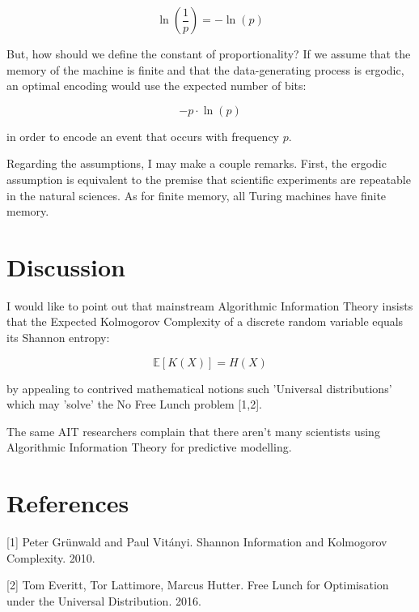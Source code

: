 \documentclass{article}
\begin{document}
\begin{equation}
\ln(\frac{1}{p}) = - \ln(p)
\end{equation}

But, how should we define the constant of proportionality? If we assume that the memory of the machine is finite and that
the data-generating process is ergodic, an optimal encoding would use the expected number of bits:

\begin{equation}
-p \cdot \ln(p)
\end{equation}

in order to encode an event that occurs with frequency $p$.

Regarding the assumptions, I may make a couple remarks. First, the ergodic assumption is equivalent to the premise that
scientific experiments are repeatable in the natural sciences. As for finite memory, all Turing machines have finite
memory.

\newpage 

\section{Discussion}

I would like to point out that mainstream Algorithmic Information Theory insists that the Expected Kolmogorov Complexity
of a discrete random variable equals its Shannon entropy:

\begin{equation}
\mathbb{E}[K(X)] = H(X)
\end{equation}

by appealing to contrived mathematical notions such 'Universal distributions' which may 'solve' the No Free Lunch problem [1,2].

The same AIT researchers complain that there aren't many scientists using Algorithmic Information Theory for predictive
modelling.

\section*{References}

\small
[1] Peter Grünwald and Paul Vitányi. Shannon Information and Kolmogorov Complexity. 2010.

[2] Tom Everitt, Tor Lattimore, Marcus Hutter. Free Lunch for Optimisation under the Universal Distribution. 2016.
\end{document}
